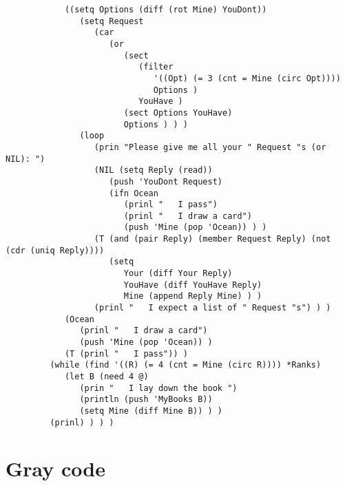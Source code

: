 \begin{verbatim}
            ((setq Options (diff (rot Mine) YouDont))
               (setq Request
                  (car
                     (or
                        (sect
                           (filter
                              '((Opt) (= 3 (cnt = Mine (circ Opt))))
                              Options )
                           YouHave )
                        (sect Options YouHave)
                        Options ) ) )
               (loop
                  (prin "Please give me all your " Request "s (or NIL): ")
                  (NIL (setq Reply (read))
                     (push 'YouDont Request)
                     (ifn Ocean
                        (prinl "   I pass")
                        (prinl "   I draw a card")
                        (push 'Mine (pop 'Ocean)) ) )
                  (T (and (pair Reply) (member Request Reply) (not (cdr (uniq Reply))))
                     (setq
                        Your (diff Your Reply)
                        YouHave (diff YouHave Reply)
                        Mine (append Reply Mine) ) )
                  (prinl "   I expect a list of " Request "s") ) )
            (Ocean
               (prinl "   I draw a card")
               (push 'Mine (pop 'Ocean)) )
            (T (prinl "   I pass")) )
         (while (find '((R) (= 4 (cnt = Mine (circ R)))) *Ranks)
            (let B (need 4 @)
               (prin "   I lay down the book ")
               (println (push 'MyBooks B))
               (setq Mine (diff Mine B)) ) )
         (prinl) ) ) )

\end{verbatim}

\section*{Gray code}

